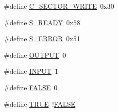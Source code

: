 \begin{DoxyCompactItemize}
\item 
\#define \hyperlink{_c_f-_01_bit_01transaction_8h_a42e5ada449a09584e6d5a3927624a20d}{C\+\_\+\+S\+E\+C\+T\+O\+R\+\_\+\+W\+R\+I\+T\+E}~0x30
\item 
\#define \hyperlink{_c_f-_01_bit_01transaction_8h_ae4b94c0e1e132ec39bb713033cf9c91d}{S\+\_\+\+R\+E\+A\+D\+Y}~0x58
\item 
\#define \hyperlink{_c_f-_01_bit_01transaction_8h_af6e8cab5d0642b96ef462156816c3a28}{S\+\_\+\+E\+R\+R\+O\+R}~0x51
\item 
\#define \hyperlink{_c_f-_01_bit_01transaction_8h_a61a3c9a18380aafb6e430e79bf596557}{O\+U\+T\+P\+U\+T}~0
\item 
\#define \hyperlink{_c_f-_01_bit_01transaction_8h_a1bb283bd7893b9855e2f23013891fc82}{I\+N\+P\+U\+T}~1
\item 
\#define \hyperlink{_c_f-_01_bit_01transaction_8h_aa93f0eb578d23995850d61f7d61c55c1}{F\+A\+L\+S\+E}~0
\item 
\#define \hyperlink{_c_f-_01_bit_01transaction_8h_aa8cecfc5c5c054d2875c03e77b7be15d}{T\+R\+U\+E}~!\hyperlink{_generic_type_defs_8h_afbf708854fe02af8475a9ba02f3196cbaa1e095cc966dbecf6a0d8aad75348d1a}{F\+A\+L\+S\+E}
\end{DoxyCompactItemize}
